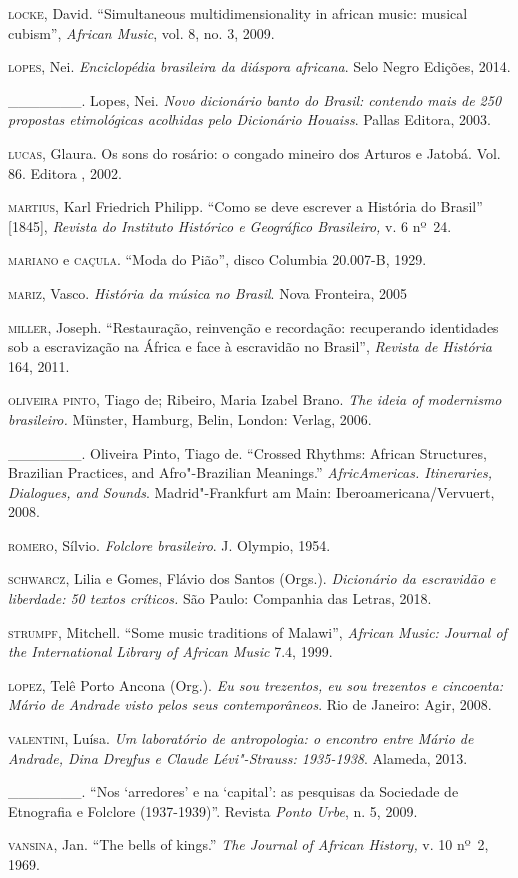 \begin{Parskip}
\textsc{locke}, David. ``Simultaneous multidimensionality in african music:
musical cubism'', \emph{African Music}, vol. 8, no. 3, 2009.

\textsc{lopes}, Nei. \emph{Enciclopédia brasileira da diáspora africana}. Selo
Negro Edições, 2014.

\_\_\_\_\_\_\_. Lopes, Nei. \emph{Novo dicionário banto do Brasil:
contendo mais de 250 propostas etimológicas acolhidas pelo Dicionário
Houaiss}. Pallas Editora, 2003.

\textsc{lucas}, Glaura. Os sons do rosário: o congado mineiro dos Arturos e
Jatobá. Vol. 86. Editora , 2002.

\textsc{martius}, Karl Friedrich Philipp. ``Como se deve escrever a História do
Brasil'' {[}1845{]}, \emph{Revista do Instituto Histórico e Geográfico
Brasileiro,} v. 6 nº~24.

\textsc{mariano} e \textsc{caçula}. ``Moda do Pião'', disco Columbia 20.007-B, 1929.

\textsc{mariz}, Vasco. \emph{História da música no Brasil}. Nova Fronteira, 2005

\textsc{miller}, Joseph. ``Restauração, reinvenção e recordação: recuperando
identidades sob a escravização na África e face à escravidão no
Brasil'', \emph{Revista de História} 164, 2011.

\textsc{oliveira pinto}, Tiago de; Ribeiro, Maria Izabel Brano. \emph{The ideia
of modernismo brasileiro.} Münster, Hamburg, Belin, London:  Verlag,
2006.

\_\_\_\_\_\_\_. Oliveira Pinto, Tiago de. ``Crossed Rhythms: African
Structures, Brazilian Practices, and Afro"-Brazilian Meanings.''
\emph{AfricAmericas. Itineraries, Dialogues, and Sounds}.
Madrid"-Frankfurt am Main: Iberoamericana/Vervuert, 2008.

\textsc{romero}, Sílvio. \emph{Folclore brasileiro}. J. Olympio, 1954.

\textsc{schwarcz}, Lilia e Gomes, Flávio dos Santos (Orgs.). \emph{Dicionário da
escravidão e liberdade: 50 textos críticos.} São Paulo: Companhia das
Letras, 2018.

\textsc{strumpf}, Mitchell. ``Some music traditions of Malawi'', \emph{African
Music: Journal of the International Library of African Music} 7.4, 1999.

\textsc{lopez}, Telê Porto Ancona (Org.). \emph{Eu sou trezentos, eu sou
trezentos e cincoenta: Mário de Andrade visto pelos seus
contemporâneos}. Rio de Janeiro: Agir, 2008.

\textsc{valentini}, Luísa. \emph{Um laboratório de antropologia: o encontro entre
Mário de Andrade, Dina Dreyfus e Claude Lévi"-Strauss: 1935-1938}.
Alameda, 2013.

\_\_\_\_\_\_\_. ``Nos `arredores' e na `capital': as pesquisas da
Sociedade de Etnografia e Folclore (1937-1939)''. Revista \emph{Ponto
Urbe}, n. 5, 2009.

\textsc{vansina}, Jan. ``The bells of kings.'' \emph{The Journal of African
History,} v. 10 nº~2, 1969.
\end{Parskip}

